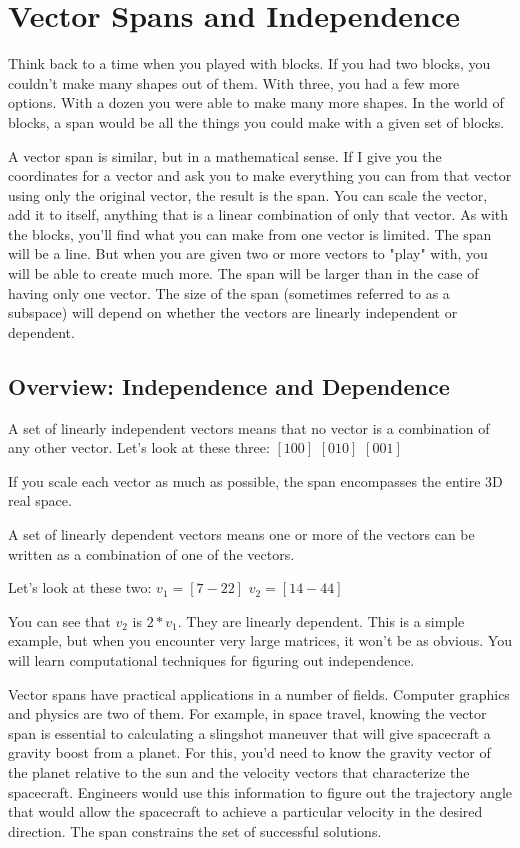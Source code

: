 \chapter{Vector Spans and Independence}
Think back to a time when you played with blocks. If you had two blocks, you couldn't make many shapes out of them. With three, you had a few more options. With a dozen you were able to make many more shapes. In the world of blocks, a span would be all the things you could make with a given set of blocks. 

A vector span is similar, but in a mathematical sense. If I give you the coordinates for a vector and ask you to make everything you can from that vector using only the original vector, the result is the span. You can scale the vector, add it to itself, anything that is a linear combination of only that vector. As with the blocks, you'll find what you can make from one vector is limited. The span will be a line. But when you are given two or more vectors to "play" with, you will be able to create much more. The span will be larger than in the case of having only one vector. The size of the span (sometimes referred to as a subspace) will depend on whether the vectors are linearly independent or dependent. 

\section{Overview: Independence and Dependence}
A set of linearly independent vectors means that no vector is a combination of any other vector. Let's look at these three:
$[1 0 0]$
$[0 1 0]$
$[0 0 1]$

If you scale each vector as much as possible, the span encompasses the entire 3D real space. 

A set of linearly dependent vectors means one or more of the vectors can be written as a combination of one of the vectors.

Let's look at these two:
$v_1 = [7 -2 2]$
$v_2 = [14 -4 4]$

You can see that $v_2$ is $2*v_1$. They are linearly dependent. This is a simple example, but when you encounter very large matrices, it won't be as obvious. You will learn computational techniques for figuring out independence.

Vector spans have practical applications in a number of fields. Computer graphics and physics are two of them. For example, in space travel, knowing the vector span is essential to calculating a slingshot maneuver that will give spacecraft a gravity boost from a planet. For this, you'd need to know the gravity vector of the planet relative to the sun and the velocity vectors that characterize the spacecraft. Engineers would use this information to figure out the trajectory angle that would allow the spacecraft to achieve a particular velocity in the desired direction. The span constrains the set of successful solutions.

